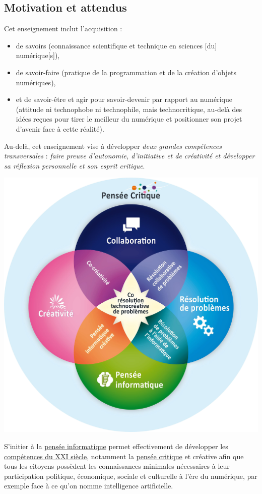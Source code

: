 \subsection*{Motivation et attendus}


Cet enseignement inclut l'acquisition :
\begin{itemize}
\item de savoirs (connaissance scientifique et technique en sciences [du] numérique[s]),
\item de savoir-faire (pratique de la programmation et de la création d'objets numériques),
\item et de savoir-être et agir pour savoir-devenir par rapport au numérique (attitude ni technophobe ni technophile, mais technocritique, au-delà des idées reçues pour tirer le meilleur du numérique et positionner son projet d'avenir face à cette réalité).
\end{itemize}

Au-delà, cet enseignement vise à développer \textit{deux grandes compétences transversales} : \textit{faire preuve d’autonomie, d’initiative et de créativité et développer sa réflexion personnelle et son esprit critique}.

\begin{center}
\includegraphics[width=0.8\linewidth]{./Images/Chapter00/cocreatic.png}
\end{center}

S'initier à la \href{https://project.inria.fr/classcode/mais-pourquoi-classcode-parle-de-pensee-informatique/}{pensée informatique} permet effectivement de développer les \href{https://en.wikipedia.org/wiki/21st_century_skills}{compétences du XXI siècle}, notamment la \href{https://pixees.fr/critique-de-lesprit-critique/}{pensée critique} et créative afin que tous les citoyens possèdent les connaissances minimales nécessaires à leur participation politique, économique, sociale et culturelle à l'ère du numérique, par exemple face à ce qu'on nomme intelligence artificielle.

